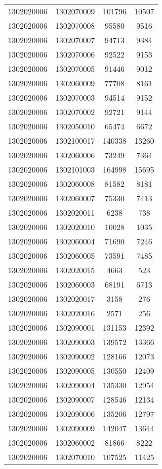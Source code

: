 \begin{longtable}{llcc}
1302020006 & 1302070009 & 101796 & 10507\\
1302020006 & 1302070008 & 95580 & 9516\\
1302020006 & 1302070007 & 94713 & 9384\\
1302020006 & 1302070006 & 92522 & 9153\\
1302020006 & 1302070005 & 91446 & 9012\\
1302020006 & 1302060009 & 77708 & 8161\\
1302020006 & 1302070003 & 94514 & 9152\\
1302020006 & 1302070002 & 92721 & 9144\\
1302020006 & 1302050010 & 65474 & 6672\\
1302020006 & 1302100017 & 140338 & 13260\\
1302020006 & 1302060006 & 73249 & 7364\\
1302020006 & 1302101003 & 164998 & 15695\\
1302020006 & 1302060008 & 81582 & 8181\\
1302020006 & 1302060007 & 75330 & 7413\\
1302020006 & 1302020011 & 6238 & 738\\
1302020006 & 1302020010 & 10028 & 1035\\
1302020006 & 1302060004 & 71690 & 7246\\
1302020006 & 1302060005 & 73591 & 7485\\
1302020006 & 1302020015 & 4663 & 523\\
1302020006 & 1302060003 & 68191 & 6713\\
1302020006 & 1302020017 & 3158 & 276\\
1302020006 & 1302020016 & 2571 & 256\\
1302020006 & 1302090001 & 131153 & 12392\\
1302020006 & 1302090003 & 139572 & 13366\\
1302020006 & 1302090002 & 128166 & 12073\\
1302020006 & 1302090005 & 130550 & 12409\\
1302020006 & 1302090004 & 135330 & 12954\\
1302020006 & 1302090007 & 128546 & 12134\\
1302020006 & 1302090006 & 135206 & 12797\\
1302020006 & 1302090009 & 142047 & 13644\\
1302020006 & 1302060002 & 81866 & 8222\\
1302020006 & 1302070010 & 107525 & 11425\\

\end{longtable}
